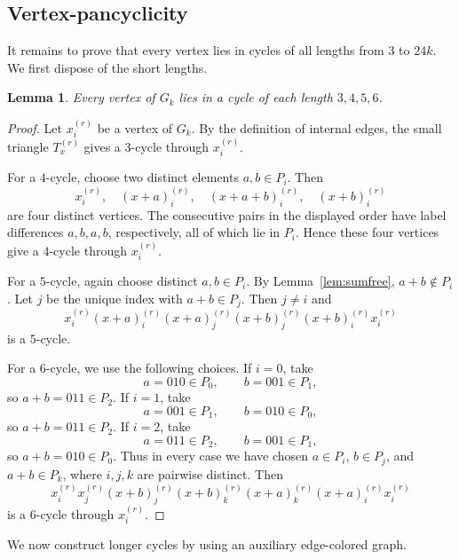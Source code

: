 \documentclass[12pt]{article}
\newtheorem{lemma}{Lemma}
\begin{document}
\subsection{Vertex-pancyclicity}\label{sec:vertex}

It remains to prove that every vertex lies in cycles of all lengths from $3$ to $24k$. We first dispose of the short lengths.

\begin{lemma}\label{lem:short-cycles}
Every vertex of $G_k$ lies in a cycle of each length $3,4,5,6$.
\end{lemma}

\begin{proof}
Let $x_i^{(r)}$ be a vertex of $G_k$. By the definition of internal edges, the small triangle $T_x^{(r)}$ gives a $3$-cycle through $x_i^{(r)}$.

For a $4$-cycle, choose two distinct elements $a,b\in P_i$. Then
\[
x_i^{(r)},\quad (x+a)_i^{(r)},\quad (x+a+b)_i^{(r)},\quad (x+b)_i^{(r)}
\]
are four distinct vertices. The consecutive pairs in the displayed order have label differences $a, b, a, b$, respectively, all of which lie in $P_i$. Hence these four vertices give a $4$-cycle through $x_i^{(r)}$.

For a $5$-cycle, again choose distinct $a,b\in P_i$. By Lemma~\ref{lem:sumfree}, $a+b\notin P_i$. Let $j$ be the unique index with $a+b\in P_j$. Then $j\ne i$ and
\[
x_i^{(r)} (x+a)_i^{(r)}
(x+a)_j^{(r)}
(x+b)_j^{(r)}
(x+b)_i^{(r)}
x_i^{(r)}
\]
is a $5$-cycle. 

For a $6$-cycle, we use the following choices. If $i=0$, take
\[
a=010\in P_0,
\qquad b=001\in P_1,
\]
so $a+b=011\in P_2$. If $i=1$, take
\[
a=001\in P_1,
\qquad b=010\in P_0,
\]
so $a+b=011\in P_2$. If $i=2$, take
\[
a=011\in P_2,
\qquad b=001\in P_1,
\]
so $a+b=010\in P_0$.
Thus in every case we have chosen $a\in P_i$, $b\in P_j$, and $a+b\in P_k$, where $i,j,k$ are pairwise distinct. Then
\[
x_i^{(r)}
x_j^{(r)}
(x+b)_j^{(r)}
(x+b)_k^{(r)}
(x+a)_k^{(r)}
(x+a)_i^{(r)}
x_i^{(r)}
\]
is a $6$-cycle through $x_i^{(r)}$. %
\end{proof}

We now construct longer cycles by using an auxiliary edge-colored graph.
\end{document}
